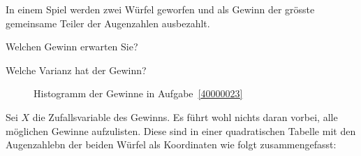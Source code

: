 In einem Spiel werden zwei Würfel geworfen und als Gewinn
der grösste gemeinsame Teiler der Augenzahlen ausbezahlt.
\begin{teilaufgaben}
\item
Welchen Gewinn erwarten Sie?
\item
Welche Varianz hat der Gewinn?
\end{teilaufgaben}


\begin{loesung}
\begin{figure}
\centering
{}
\caption{Histogramm der Gewinne in Aufgabe~\ref{40000023}
\label{40000023:histogram}}
\end{figure}
Sei $X$ die Zufallsvariable des Gewinns.
Es führt wohl nichts daran vorbei, alle möglichen Gewinne aufzulisten.
Diese sind in einer quadratischen Tabelle mit den Augenzahlebn der beiden 
Würfel als Koordinaten wie folgt zusammengefasst:
\begin{center}
\def\feld#1#2#3{
	\node at ({(#1-0.5)*\h},{(6.5-(#2))*\h}) {\strut$#3\mathstrut$};
}
\def\h{0.6}
\end{center}
\end{loesung}
